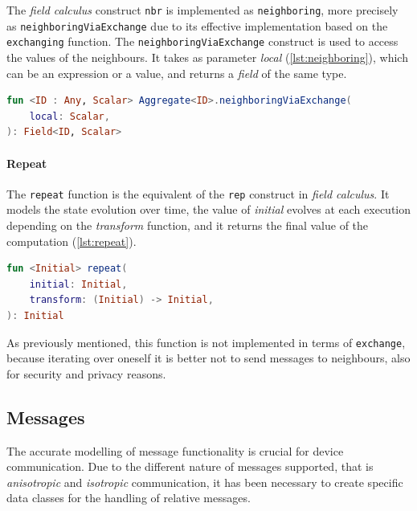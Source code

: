 The \emph{field calculus} construct \texttt{nbr} is implemented as \texttt{neighboring}, more precisely as \texttt{neighboringViaExchange}
due to its effective implementation based on the \texttt{exchanging} function.
The \texttt{neighboringViaExchange} construct is used to access the values of the neighbours.
It takes as parameter \emph{local} (\ref{lst:neighboring}), which can be an expression or a value, and returns a \emph{field} of the same type.

\begin{lstlisting}[language=kt,label={lst:neighboring}, caption={The signature of the \texttt{neighboringViaExchange} function.}]
fun <ID : Any, Scalar> Aggregate<ID>.neighboringViaExchange(
    local: Scalar,
): Field<ID, Scalar>
\end{lstlisting}


\paragraph{Repeat}
The \texttt{repeat} function is the equivalent of the \texttt{rep} construct in \emph{field calculus}.
It models the state evolution over time, the value of \emph{initial} evolves at each execution depending on the \emph{transform} function,
and it returns the final value of the computation (\ref{lst:repeat}).

\begin{lstlisting}[language=kt,label={lst:repeat}, caption={The signature of the \texttt{repeat} function.}]
fun <Initial> repeat(
    initial: Initial,
    transform: (Initial) -> Initial,
): Initial
\end{lstlisting}

As previously mentioned, this function is not implemented in terms of \texttt{exchange}, because iterating over oneself
it is better not to send messages to neighbours, also for security and privacy reasons.

\subsection{Messages}
\label{subsec:messages}

The accurate modelling of message functionality is crucial for device communication.
Due to the different nature of messages supported, that is \emph{anisotropic} and \emph{isotropic} communication,
it has been necessary to create specific data classes for the handling of relative messages.


